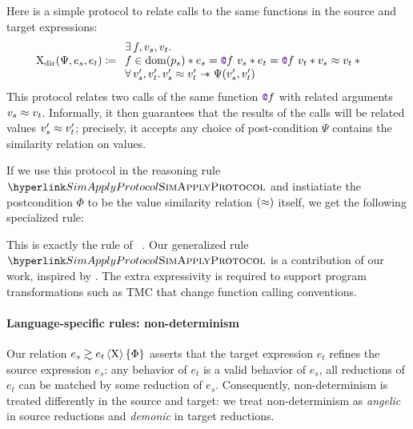 Here is a simple protocol to relate calls to the same functions in the source and target expressions:
\begin{align*}
  \Chi_\mathrm{dir} (\Psi, e_s, e_t)
  &\coloneqq
  \begin{array}{l}
          \exists f, v_s, v_t \ldotp
      \\
          f \in \dom{p_s} \iSep
          e_s = \lambdCall{\lambdFunc{f}}{v_s} \iSep
          e_t = \lambdCall{\lambdFunc{f}}{v_t} \iSep
          v_s \iSimilar v_t \iSep {}
      \\
          \forall v_s', v_t' \ldotp
          v_s' \iSimilar v_t' \iSepImp
          \Psi (v_s', v_t')
  \end{array}
\end{align*}
This protocol relates two calls of the same function $\lambdFunc{f}$
with related arguments $v_s \approx v_t$. Informally, it then
guarantees that the results of the calls will be related values
$v_s' \approx v_t'$; precisely, it accepts any choice of post-condition $\Psi$ contains the similarity relation on values.

If we use this protocol in the reasoning rule
$\RefTirName{SimApplyProtocol}$ and instiatiate the postcondition $\Phi$ to be the value similarity relation $(\approx)$ itself, we get the following specialized rule:
This is exactly the  rule of \Simuliris~\citep*{TODO-simuliris}. Our generalized rule $\RefTirName{SimApplyProtocol}$ is a contribution of our work, inspired by \citet*{TODO-paulo}. The extra expressivity is required to support program transformations such as TMC that change function calling conventions.

\paragraph{Language-specific rules: non-determinism}
%
Our relation $\iSim[\Chi]{\Phi}{e_s}{e_t}$ asserts that the target expression $e_t$ refines the source expression $e_s$: any behavior of $e_t$ is a valid behavior of $e_s$, all reductions of $e_t$ can be matched by some reduction of $e_s$. Consequently, non-determinism is treated differently in the source and target: we treat non-determinism as \emph{angelic} in source reductions and \emph{demonic} in target reductions.

